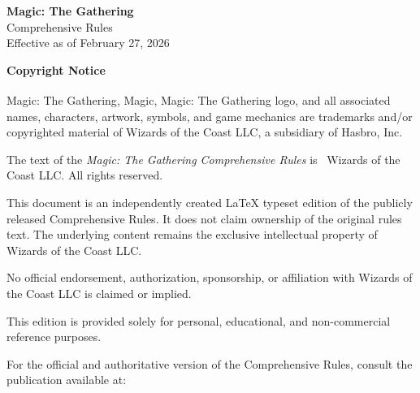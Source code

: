 \documentclass[11pt,twoside]{book}
\begin{document}
	
	\clearpage
	\thispagestyle{empty}
	
	\vspace*{\fill}
	
	\begin{center}
		{\Large \textbf{Magic: The Gathering}}\\[4pt]
		{\large Comprehensive Rules}\\[6pt]
		Effective as of February 27, 2026
	\end{center}
	
	\vspace{1.5cm}
	
	\noindent
	\textbf{Copyright Notice}
	
	\vspace{0.5cm}
	
	\noindent
	Magic: The Gathering\textsuperscript{\textregistered}, Magic\textsuperscript{\textregistered}, 
	Magic: The Gathering logo, and all associated names, characters, artwork, 
	symbols, and game mechanics are trademarks and/or copyrighted material of 
	Wizards of the Coast LLC, a subsidiary of Hasbro, Inc.
	
	\vspace{0.5cm}
	
	\noindent
	The text of the \textit{Magic: The Gathering Comprehensive Rules} is 
	\textcopyright\ Wizards of the Coast LLC. All rights reserved.
	
	\vspace{0.5cm}
	
	\noindent
	This document is an independently created LaTeX typeset edition of the 
	publicly released Comprehensive Rules. It does not claim ownership of the 
	original rules text. The underlying content remains the exclusive intellectual 
	property of Wizards of the Coast LLC.
	
	\vspace{0.5cm}
	
	\noindent
	No official endorsement, authorization, sponsorship, or affiliation with 
	Wizards of the Coast LLC is claimed or implied.
	
	\vspace{0.5cm}
	
	\noindent
	This edition is provided solely for personal, educational, and 
	non-commercial reference purposes.
	
	\vspace{0.5cm}
	
	\noindent
	For the official and authoritative version of the Comprehensive Rules, 
	consult the publication available at:
	
\end{document}
